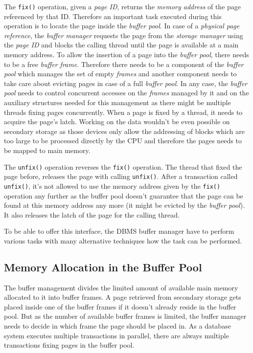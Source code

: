     The \lstinline{fix()} operation, given a \emph{page ID}, returns the \emph{memory address} of the page referenced by that ID. Therefore an important task executed during this operation is to locate the page inside the \emph{buffer pool}. In case of a \emph{physical page reference}, the \emph{buffer manager} requests the page from the \emph{storage manager} using the \emph{page ID} and blocks the calling thread until the page is available at a main memory address. To allow the insertion of a page into the \emph{buffer pool}, there needs to be a free \emph{buffer frame}. Therefore there needs to be a component of the \emph{buffer pool} which manages the set of empty \emph{frames} and another component needs to take care about evicting pages in case of a full \emph{buffer pool}. In any case, the \emph{buffer pool} needs to control concurrent accesses on the \emph{frames} managed by it and on the auxiliary structures needed for this management as there might be multiple threads fixing pages concurrently. When a page is fixed by a thread, it needs to acquire the page's latch. Working on the data wouldn't be even possible on secondary storage as those devices only allow the addressing of blocks which are too large to be processed directly by the CPU and therefore the pages needs to be mapped to main memory.

    The \lstinline{unfix()} operation reverses the \lstinline{fix()} operation. The thread that fixed the page before, releases the page with calling \lstinline{unfix()}. After a transaction called \lstinline{unfix()}, it's not allowed to use the memory address given by the \lstinline{fix()} operation any further as the buffer pool doesn't guarantee that the page can be found at this memory address any more (it might be evicted by the \emph{buffer pool}). It also releases the latch of the page for the calling thread.

    To be able to offer this interface, the DBMS buffer manager have to perform various tasks with many alternative techniques how the task can be performed.

\subsection[Memory Allocation]{Memory Allocation in the Buffer Pool} \label{subsec:allocation}

    The buffer management divides the limited amount of available main memory allocated to it into buffer frames. A page retrieved from secondary storage gets placed inside one of the buffer frames if it doesn't already reside in the buffer pool. But as the number of available buffer frames is limited, the buffer manager needs to decide in which frame the page should be placed in. As a database system executes multiple transactions in parallel, there are always multiple transactions fixing pages in the buffer pool. 

